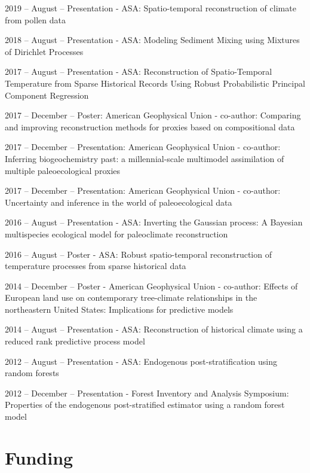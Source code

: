 \documentclass[11pt,]{article}
\renewenvironment{itemize}{
  \begin{list}{}{
    \setlength{\leftmargin}{1.5em}
  }
}{
  \end{list}
}
\begin{document}
\begin{itemize}
\item
  2019 -- August -- Presentation - ASA: Spatio-temporal reconstruction
  of climate from pollen data
\item
  2018 -- August -- Presentation - ASA: Modeling Sediment Mixing using
  Mixtures of Dirichlet Processes
\item
  2017 -- August -- Presentation - ASA: Reconstruction of
  Spatio-Temporal Temperature from Sparse Historical Records Using
  Robust Probabilistic Principal Component Regression
\item
  2017 -- December -- Poster: American Geophysical Union - co-author:
  Comparing and improving reconstruction methods for proxies based on
  compositional data
\item
  2017 -- December -- Presentation: American Geophysical Union -
  co-author: Inferring biogeochemistry past: a millennial-scale
  multimodel assimilation of multiple paleoecological proxies
\item
  2017 -- December -- Presentation: American Geophysical Union -
  co-author: Uncertainty and inference in the world of paleoecological
  data
\item
  2016 -- August -- Presentation - ASA: Inverting the Gaussian process:
  A Bayesian multispecies ecological model for paleoclimate
  reconstruction
\item
  2016 -- August -- Poster - ASA: Robust spatio-temporal reconstruction
  of temperature processes from sparse historical data
\item
  2014 -- December -- Poster - American Geophysical Union - co-author:
  Effects of European land use on contemporary tree-climate
  relationships in the northeastern United States: Implications for
  predictive models
\item
  2014 -- August -- Presentation - ASA: Reconstruction of historical
  climate using a reduced rank predictive process model
\item
  2012 -- August -- Presentation - ASA: Endogenous post-stratification
  using random forests
\item
  2012 -- December -- Presentation - Forest Inventory and Analysis
  Symposium: Properties of the endogenous post-stratified estimator
  using a random forest model
\end{itemize}

\hypertarget{funding}{%
\section{Funding}\label{funding}}
\end{document}
